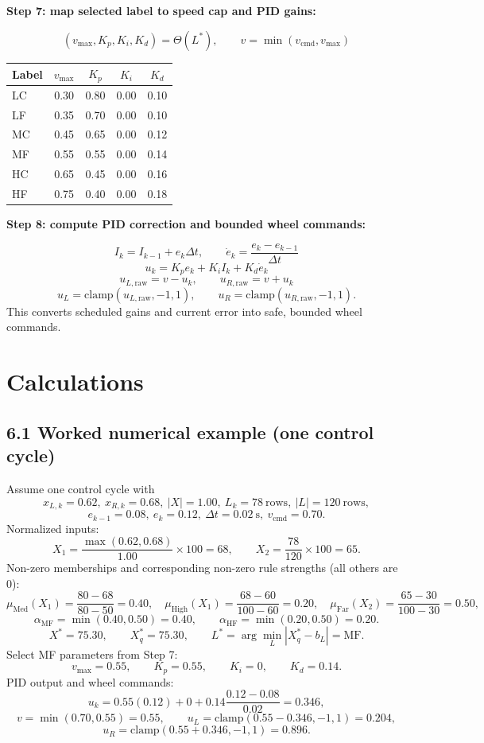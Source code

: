 \documentclass{article}
\begin{document}
\noindent\textbf{Step 7: map selected label to speed cap and PID gains:}\par
\[
(v_{\max},K_p,K_i,K_d)=\Theta(L^*),\qquad
v=\min(v_{\text{cmd}},v_{\max})
\]
\begin{center}
\begin{tabular}{lcccc}
\toprule
Label & $v_{\max}$ & $K_p$ & $K_i$ & $K_d$ \\
\midrule
LC & 0.30 & 0.80 & 0.00 & 0.10 \\
LF & 0.35 & 0.70 & 0.00 & 0.10 \\
MC & 0.45 & 0.65 & 0.00 & 0.12 \\
MF & 0.55 & 0.55 & 0.00 & 0.14 \\
HC & 0.65 & 0.45 & 0.00 & 0.16 \\
HF & 0.75 & 0.40 & 0.00 & 0.18 \\
\bottomrule
\end{tabular}
\end{center}

\noindent\textbf{Step 8: compute PID correction and bounded wheel commands:}\par
\[
I_k=I_{k-1}+e_k\Delta t,\qquad
\dot e_k=\frac{e_k-e_{k-1}}{\Delta t}
\]
\[
u_k=K_p e_k + K_i I_k + K_d\dot e_k
\]
\[
u_{L,\text{raw}}=v-u_k,\qquad
u_{R,\text{raw}}=v+u_k
\]
\[
u_L=\text{clamp}(u_{L,\text{raw}},-1,1),\qquad
u_R=\text{clamp}(u_{R,\text{raw}},-1,1).
\]
\noindent This converts scheduled gains and current error into safe, bounded wheel commands.

\section{Calculations}
\subsection*{6.1 Worked numerical example (one control cycle)}
Assume one control cycle with
\[
x_{L,k}=0.62,\ x_{R,k}=0.68,\ |X|=1.00,\ L_k=78\ \text{rows},\ |L|=120\ \text{rows},
\]
\[
e_{k-1}=0.08,\ e_k=0.12,\ \Delta t=0.02\ \text{s},\ v_{\text{cmd}}=0.70.
\]
Normalized inputs:
\[
X_1=\frac{\max(0.62,0.68)}{1.00}\times100=68,\qquad
X_2=\frac{78}{120}\times100=65.
\]
Non-zero memberships and corresponding non-zero rule strengths (all others are 0):
\[
\mu_{\text{Med}}(X_1)=\frac{80-68}{80-50}=0.40,\quad
\mu_{\text{High}}(X_1)=\frac{68-60}{100-60}=0.20,\quad
\mu_{\text{Far}}(X_2)=\frac{65-30}{100-30}=0.50,
\]
\[
\alpha_{\text{MF}}=\min(0.40,0.50)=0.40,\qquad
\alpha_{\text{HF}}=\min(0.20,0.50)=0.20.
\]
\[
X^*=75.30,\qquad X_q^*=75.30,\qquad
L^*=\arg\min_{L}|X_q^*-b_L|=\text{MF}.
\]
Select MF parameters from Step 7:
\[
v_{\max}=0.55,\qquad K_p=0.55,\qquad K_i=0,\qquad K_d=0.14.
\]
PID output and wheel commands:
\[
u_k=0.55(0.12)+0+0.14\frac{0.12-0.08}{0.02}=0.346,
\]
\[
v=\min(0.70,0.55)=0.55,\qquad
u_L=\text{clamp}(0.55-0.346,-1,1)=0.204,
\]
\[
u_R=\text{clamp}(0.55+0.346,-1,1)=0.896.
\]
\end{document}
